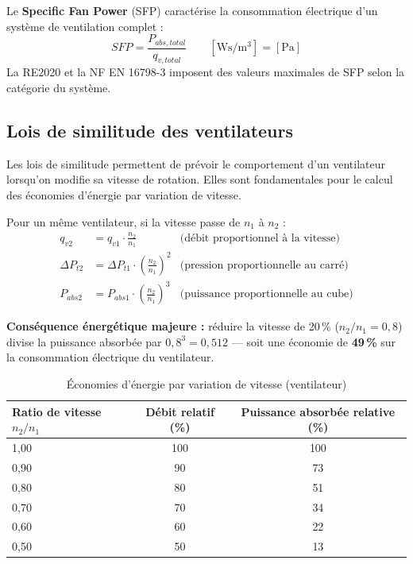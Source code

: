 \begin{definition}[title=Efficacité du système de ventilation (SFP)]
Le \textbf{Specific Fan Power} (SFP) caractérise la consommation électrique d'un système de ventilation complet :
\begin{equation}
  SFP = \frac{P_{abs,total}}{q_{v,total}} \qquad \left[\si{\watt\second\per\cubic\metre}\right] = \left[\si{\pascal}\right]
\end{equation}
La RE2020 et la NF EN 16798-3 imposent des valeurs maximales de SFP selon la catégorie du système.
\end{definition}

\subsection{Lois de similitude des ventilateurs}

Les lois de similitude permettent de prévoir le comportement d'un ventilateur lorsqu'on modifie sa vitesse de rotation. Elles sont fondamentales pour le calcul des économies d'énergie par variation de vitesse.

\begin{methode}[title=Lois de similitude (variation de vitesse)]
Pour un même ventilateur, si la vitesse passe de $n_1$ à $n_2$ :
\begin{align}
  q_{v2} &= q_{v1} \cdot \frac{n_2}{n_1} & \text{(débit proportionnel à la vitesse)} \label{eq:sim_q}\\
  \Delta P_{t2} &= \Delta P_{t1} \cdot \left(\frac{n_2}{n_1}\right)^2 & \text{(pression proportionnelle au carré)} \label{eq:sim_p}\\
  P_{abs2} &= P_{abs1} \cdot \left(\frac{n_2}{n_1}\right)^3 & \text{(puissance proportionnelle au cube)} \label{eq:sim_p3}
\end{align}

\textbf{Conséquence énergétique majeure :} réduire la vitesse de 20\,\% ($n_2/n_1 = 0{,}8$) divise la puissance absorbée par $0{,}8^3 = 0{,}512$ — soit une économie de \textbf{49\,\%} sur la consommation électrique du ventilateur.
\end{methode}

\begin{table}[H]
  \centering
  \caption{Économies d'énergie par variation de vitesse (ventilateur)}
  \begin{tabular}{lcc}
    \toprule
    Ratio de vitesse $n_2/n_1$ & Débit relatif (\%) & Puissance absorbée relative (\%) \\
    \midrule
    1,00 & 100 & 100 \\
    0,90 & 90 & 73 \\
    0,80 & 80 & 51 \\
    0,70 & 70 & 34 \\
    0,60 & 60 & 22 \\
    0,50 & 50 & 13 \\
    \bottomrule
  \end{tabular}
\end{table}

